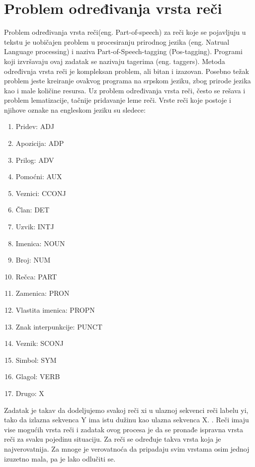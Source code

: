 \documentclass[12pt,oneside]{memoir}
\begin{document}
\section{Problem određivanja vrsta reči}

Problem određivanja vrsta reči(eng. Part-of-speech) za reči koje se pojavljuju u tekstu je uobičajen problem u procesiranju prirodnog jezika (eng. Natrual Language processing) i naziva Part-of-Speech-tagging (Pos-tagging).  Programi koji izvršavaju ovaj zadatak se nazivaju tagerima (eng. taggers).  Metoda određivnja vrsta reči je kompleksan problem, ali bitan i izazovan.  Posebno težak problem jeste kreiranje ovakvog programa na srpskom jeziku, zbog prirode jezika kao i male količine resursa.  Uz problem određivanja vrsta reči, često se rešava i problem lematizacije, tačnije pridavanje leme reči. 
Vrste reči koje postoje i njihove oznake na engleskom jeziku su sledece:

\begin{enumerate}
\item Pridev: ADJ
\item Apozicija: ADP
\item Prilog: ADV
\item Pomoćni: AUX
\item Veznici: CCONJ
\item Član: DET
\item Uzvik: INTJ
\item Imenica: NOUN
\item Broj: NUM
\item Rečca: PART
\item Zamenica: PRON
\item Vlastita imenica: PROPN
\item Znak interpunkcije: PUNCT
\item Veznik: SCONJ
\item Simbol: SYM
\item Glagol: VERB
\item Drugo: X
\end{enumerate}

Zadatak je takav da dodeljujemo svakoj reči xi u ulaznoj sekvenci reči labelu yi,  tako da izlazna sekvenca Y ima istu dužinu kao ulazna sekvenca X.  \cite{pos_tagging}. Reči imaju vise mogućih vrsta reči i zadatak ovog procesa je da se pronađe ispravna vrsta reči za svaku pojedinu situaciju.  Za reči se određuje takva vrsta koja je najverovatnija.  Za mnoge je verovatnoća da pripadaju svim vrstama osim jednoj izuzetno mala,  pa je lako odlučiti se.  
\end{document}
